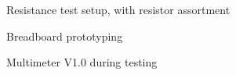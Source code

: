 \begin{figure}[h]
    \centering
    \caption{Resistance test setup, with resistor assortment}
    \label{fig:RM2}
\end{figure}

\begin{figure}[h]
    \centering
    \caption{Breadboard prototyping}
    \label{fig:breadboardPrototyping}
\end{figure}

\begin{figure}[h]
    \centering
    \caption{Multimeter V1.0 during testing}
    \label{fig:MMV1}
\end{figure}

